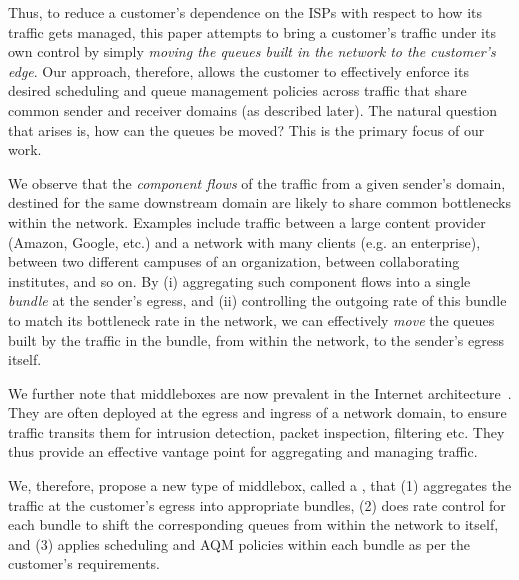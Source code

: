 Thus, to reduce a customer's dependence on the ISPs with respect to how its traffic gets managed, this paper attempts to bring a customer's traffic under its own control by simply \emph{moving the queues built in the network to the customer's edge}. Our approach, therefore, allows the customer to effectively enforce its desired scheduling and queue management policies across traffic that share common sender and receiver domains (as described later). The natural question that arises is, how can the queues be moved? This is the primary focus of our work. 

We observe that the \emph{component flows} of the traffic from a given sender's domain, destined for the same downstream domain are likely to share common bottlenecks within the network. Examples include traffic between a large content provider (\eg Amazon, Google, etc.) and a network with many clients (e.g. an enterprise), between two different campuses of an organization, between collaborating institutes, and so on. By (i) aggregating such component flows into a single \emph{bundle} at the sender's egress, and (ii) controlling the outgoing rate of this bundle to match its bottleneck rate in the network, we can effectively \emph{move} the queues built by the traffic in the bundle, from within the network, to the sender's egress itself. 

We further note that middleboxes are now prevalent in the Internet architecture~\cite{aplomb}. They are often deployed at the egress and ingress of a network domain, to ensure traffic transits them for intrusion detection, packet inspection, filtering etc. They thus provide an effective vantage point for aggregating and managing traffic. 

We, therefore, propose a new type of middlebox, called a \name, that (1) aggregates the traffic at the customer's egress into appropriate bundles, (2) does rate control for each bundle to shift the corresponding queues from within the network to itself, and (3) applies scheduling and AQM policies within each bundle as per the customer's requirements. 

